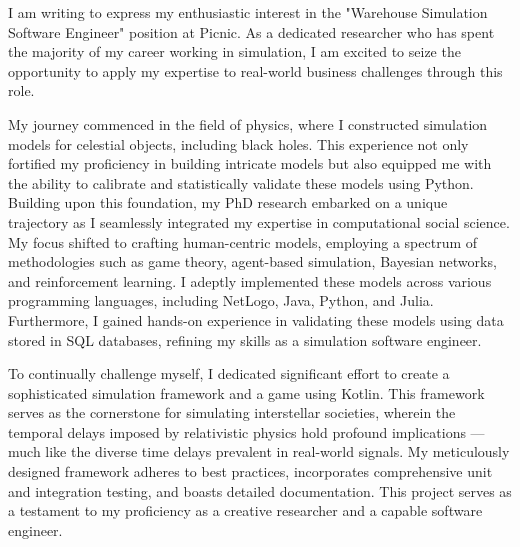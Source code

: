 \documentclass[11pt, a4paper]{awesome-cv}
\begin{document}
\makecvheader[R]

\makecvfooter
  {}%
  {}%
  {}

\makelettertitle

\begin{cvletter}

I am writing to express my enthusiastic interest in the "Warehouse Simulation Software Engineer" position at Picnic. As a dedicated researcher who has spent the majority of my career working in simulation, I am excited to seize the opportunity to apply my expertise to real-world business challenges through this role.

My journey commenced in the field of physics, where I constructed simulation models for celestial objects, including black holes. This experience not only fortified my proficiency in building intricate models but also equipped me with the ability to calibrate and statistically validate these models using Python. Building upon this foundation, my PhD research embarked on a unique trajectory as I seamlessly integrated my expertise in computational social science. My focus shifted to crafting human-centric models, employing a spectrum of methodologies such as game theory, agent-based simulation, Bayesian networks, and reinforcement learning. I adeptly implemented these models across various programming languages, including NetLogo, Java, Python, and Julia. Furthermore, I gained hands-on experience in validating these models using data stored in SQL databases, refining my skills as a simulation software engineer.

To continually challenge myself, I dedicated significant effort to create a sophisticated simulation framework and a game using Kotlin. This framework serves as the cornerstone for simulating interstellar societies, wherein the temporal delays imposed by relativistic physics hold profound implications — much like the diverse time delays prevalent in real-world signals. My meticulously designed framework adheres to best practices, incorporates comprehensive unit and integration testing, and boasts detailed documentation. This project serves as a testament to my proficiency as a creative researcher and a capable software engineer.


\end{cvletter}
\end{document}

